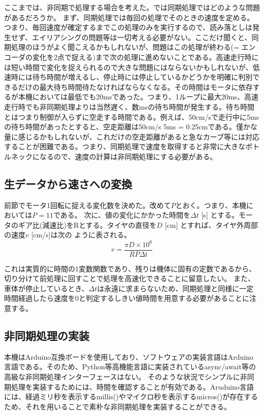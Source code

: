 \documentclass{ltjsreport}
\begin{document}
ここまでは、非同期で処理する場合を考えた。では同期処理ではどのような問題があるだろうか。
まず、同期処理では毎回の処理でそのときの速度を定める。つまり、毎回速度が確定するまでこの処理のみを実行するので、読み落としは発生せず、エイリアシングの問題等は一切考える必要がない。ここだけ聞くと、同期処理のほうがよく聞こえるかもしれないが、問題はこの処理が終わる(= エンコーダの変化を2点で捉える)まで次の処理に進めないことである。高速走行時には短い時間で変化を捉えられるので大きな問題にはならないかもしれないが、低速時には待ち時間が増えるし、停止時には停止しているかどうかを明確に判別できるだけの最大待ち時間待たなければならなくなる。その時間はモータに依存するが本機においては最低でも20msであった。つまり、1ループに最大20ms、高速走行時でも非同期処理よりは当然遅く、数msの待ち時間が発生する。待ち時間とはつまり制御が入らずに空走する時間である。例えば、50cm/sで走行中に5msの待ち時間があったとすると、空走距離は50cm/s \times 5ms = 0.25cmである。僅かな量に感じるかもしれないが、これだけの空走距離があると急なカーブ等には対応することが困難である。つまり、同期処理で速度を取得すると非常に大きなボトルネックになるので、速度の計算は非同期処理にする必要がある。


\subsection{生データから速さへの変換}
前節でモータ1回転に捉える変化数を決めた。改めて$P$とおく。つまり、本機においては$P=11$である。
次に、値の変化にかかった時間を$\Delta t$ [\mu s] とする。モータのギア比(減速比)をRとする。タイヤの直径を$D$ [cm] とすれば、タイヤ外周部の速度$v$ [cm/s]は次の
ように表される。
\[ v = \frac{\pi D \times 10^6}{R P \Delta t} \]

これは実質的に時間の1変数関数であり、残りは機体に固有の定数であるから、切り分けて前処理に回すことで処理を高速化できることに留意したい。
また、車体が停止しているとき、$\Delta t$は永遠に求まらないため、同期処理と同様に一定時間経過したら速度を0と判定するしきい値時間を用意する必要があることに注意する。

\subsection{非同期処理の実装}
本機はArduino互換ボードを使用しており、ソフトウェアの実装言語はArduino言語である。そのため、Python等高機能言語に実装されているasync/await等の高級な非同期処理インターフェースはない。
そのような状況でシンプルに非同期処理を実装するためには、時間を確認することが有効である。Aruduino言語には、経過ミリ秒を表示するmillis()やマイクロ秒を表示するmicros()が存在するため、それを用いることで素朴な非同期処理を実装することができる。
\end{document}

